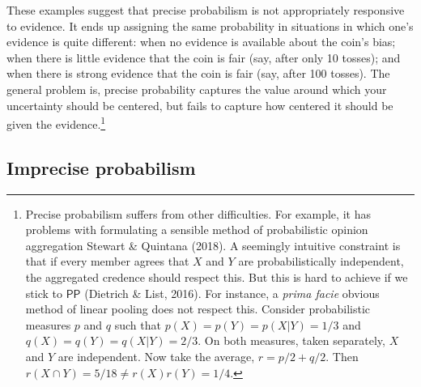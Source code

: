 \documentclass[
  10pt,
  dvipsnames,enabledeprecatedfontcommands]{scrartcl}
\newcommand{\s}[1]{\mbox{$\mathsf{#1}$}}
\begin{document}
These examples suggest that precise probabilism is not appropriately
responsive to evidence. It ends up assigning the same probability in
situations in which one's evidence is quite different: when no evidence
is available about the coin's bias; when there is little evidence that
the coin is fair (say, after only 10 tosses); and when there is strong
evidence that the coin is fair (say, after 100 tosses). The general
problem is, precise probability captures the value around which your
uncertainty should be centered, but fails to capture how centered it
should be given the evidence.\footnote{Precise probabilism suffers from
  other difficulties. For example, it has problems with formulating a
  sensible method of probabilistic opinion aggregation Stewart \&
  Quintana (2018). A seemingly intuitive constraint is that if every
  member agrees that \(X\) and \(Y\) are probabilistically independent,
  the aggregated credence should respect this. But this is hard to
  achieve if we stick to \s{PP} (Dietrich \& List, 2016). For instance,
  a \emph{prima facie} obvious method of linear pooling does not respect
  this. Consider probabilistic measures \(p\) and \(q\) such that
  \(p(X) = p(Y) = p(X\vert Y) = 1/3\) and
  \(q(X) = q(Y) = q(X\vert Y) = 2/3\). On both measures, taken
  separately, \(X\) and \(Y\) are independent. Now take the average,
  \(r=p/2+q/2\). Then \(r(X\cap Y) = 5/18 \neq r(X)r(Y)=1/4\).}

\hypertarget{imprecise-probabilism}{%
\subsection{Imprecise probabilism}\label{imprecise-probabilism}}
\end{document}

